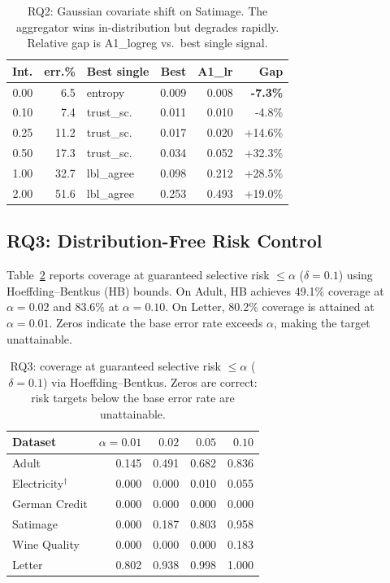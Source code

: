 \documentclass[conference]{IEEEtran}
\begin{document}
\begin{table}[t]
\centering
\caption{RQ2: Gaussian covariate shift on Satimage. The aggregator wins in-distribution but degrades rapidly. Relative gap is A1\_logreg vs.\ best single signal.}
\label{tab:shift}
\begin{tabular}{r r l r r r}
\toprule
Int. & err.\% & Best single & Best & A1\_lr & Gap \\
\midrule
0.00 & 6.5 & entropy & 0.009 & 0.008 & \textbf{-7.3\%} \\
0.10 & 7.4 & trust\_sc. & 0.011 & 0.010 & -4.8\% \\
0.25 & 11.2 & trust\_sc. & 0.017 & 0.020 & +14.6\% \\
0.50 & 17.3 & trust\_sc. & 0.034 & 0.052 & +32.3\% \\
1.00 & 32.7 & lbl\_agree & 0.098 & 0.212 & +28.5\% \\
2.00 & 51.6 & lbl\_agree & 0.253 & 0.493 & +19.0\% \\
\bottomrule
\end{tabular}
\end{table}

\subsection{RQ3: Distribution-Free Risk Control}

Table~\ref{tab:conformal} reports coverage at guaranteed selective risk $\le \alpha$ ($\delta{=}0.1$) using Hoeffding--Bentkus (HB) bounds. On Adult, HB achieves 49.1\% coverage at $\alpha{=}0.02$ and 83.6\% at $\alpha{=}0.10$. On Letter, 80.2\% coverage is attained at $\alpha{=}0.01$. Zeros indicate the base error rate exceeds $\alpha$, making the target unattainable.

\begin{table}[t]
\centering
\caption{RQ3: coverage at guaranteed selective risk $\le\alpha$ ($\delta{=}0.1$) via Hoeffding--Bentkus. Zeros are correct: risk targets below the base error rate are unattainable.}
\label{tab:conformal}
\begin{tabular}{l r r r r}
\toprule
Dataset & $\alpha{=}0.01$ & $0.02$ & $0.05$ & $0.10$ \\
\midrule
Adult & 0.145 & 0.491 & 0.682 & 0.836 \\
Electricity$^{\dagger}$ & 0.000 & 0.000 & 0.010 & 0.055 \\
German Credit & 0.000 & 0.000 & 0.000 & 0.000 \\
Satimage & 0.000 & 0.187 & 0.803 & 0.958 \\
Wine Quality & 0.000 & 0.000 & 0.000 & 0.183 \\
Letter & 0.802 & 0.938 & 0.998 & 1.000 \\
\bottomrule
\end{tabular}
\end{table}
\end{document}
